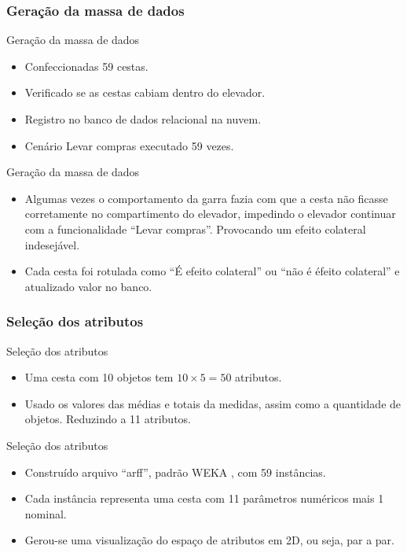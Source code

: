 \documentclass[brazil]{beamer}
\begin{document}
\subsubsection{Geração da massa de dados}
\begin{frame}{Geração da massa de dados}
   \begin{itemize}
      \item <1 ->Confeccionadas 59 cestas.
      \item <2 ->Verificado se as cestas cabiam dentro do elevador.
      \item <3 ->Registro no banco de dados relacional na nuvem.
      \item <4 ->Cenário Levar compras executado 59 vezes.
   \end{itemize}
\end{frame}

\begin{frame}{Geração da massa de dados}
   \begin{itemize}
      \item <1 ->Algumas vezes o comportamento da garra fazia com que a cesta não ficasse corretamente no compartimento do elevador, impedindo o elevador continuar com a funcionalidade ``Levar compras''. Provocando um \alert{efeito colateral indesejável}.
      \item <2 ->Cada cesta foi rotulada como \alert{``É efeito colateral''} ou \alert{``não é éfeito colateral''} e atualizado valor no banco.
   \end{itemize}
\end{frame}


\subsubsection{Seleção dos atributos}
\begin{frame}{Seleção dos atributos}
   \begin{itemize}
      \item <1 ->Uma cesta com 10 objetos tem \alert{$10 \times 5=50$ atributos}.
      \item <2 ->Usado os valores das médias e totais da medidas, assim como a quantidade de objetos. Reduzindo a \alert{11 atributos}.
   \end{itemize}
\end{frame}

\begin{frame}{Seleção dos atributos}
   \begin{itemize}
      \item <1 ->Construído arquivo ``arff'', padrão WEKA \cite{Hall:2009}, com 59 instâncias.
      \item <2 ->Cada instância representa uma cesta com 11 parâmetros numéricos mais 1 nominal.
      \item <3 -> Gerou-se uma visualização do espaço de atributos em 2D, ou seja, par a par.
   \end{itemize}
\end{frame}
\end{document}
